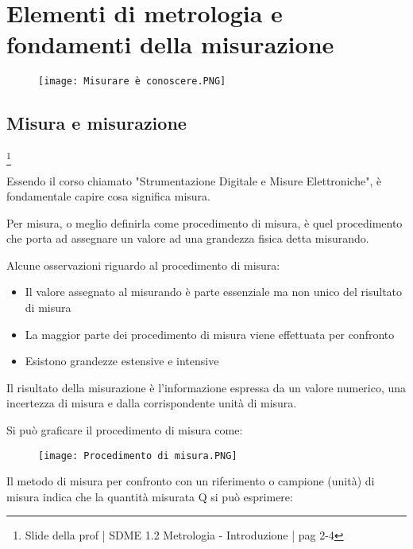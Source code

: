 \chapter{Elementi di metrologia e fondamenti della misurazione}

\begin{figure}[h]
    \centering
    \texttt{[image: Misurare è conoscere.PNG]}
\end{figure}  
    
\newpage 

\section{Misura e misurazione} 
\footnote{Slide della prof | SDME 1.2 Metrologia - Introduzione | pag 2-4 }

Essendo il corso chiamato "Strumentazione Digitale e Misure Elettroniche", 
è fondamentale capire cosa significa misura. \newline 

Per misura, o meglio definirla come procedimento di misura, è quel procedimento 
che porta ad assegnare un valore ad una grandezza fisica detta misurando. \newline 

Alcune osservazioni riguardo al procedimento di misura: 

\begin{itemize}
    \item Il valore assegnato al misurando è parte essenziale ma non unico del risultato di misura 
    \item La maggior parte dei procedimento di misura viene effettuata per confronto 
    \item Esistono grandezze estensive e intensive
\end{itemize}


Il risultato della misurazione è l'informazione espressa da un valore numerico, una incertezza di misura 
e dalla corrispondente unità di misura. \newline 

Si può graficare il procedimento di misura come: 

\begin{figure}[h]
    \centering
    \texttt{[image: Procedimento di misura.PNG]}
\end{figure}

Il metodo di misura per confronto con un riferimento o campione (unità) di misura indica 
che la quantità misurata Q si può esprimere: 

